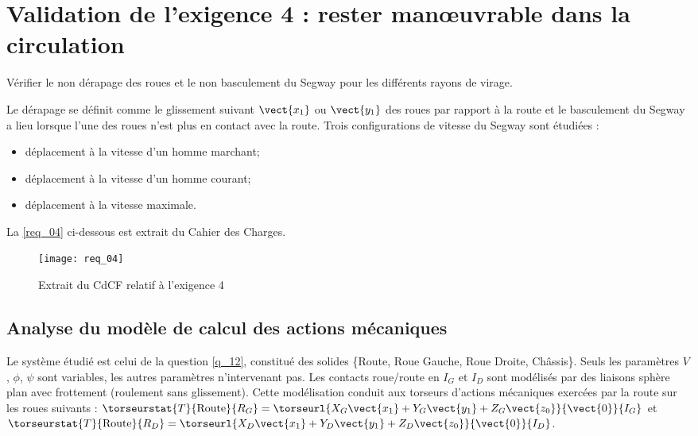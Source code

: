\section{Validation de l'exigence 4 : rester man\oe{}uvrable dans la circulation}
\begin{obj}
Vérifier le non dérapage des roues et le non basculement du Segway pour les différents rayons de virage.
\end{obj}
\ifprof
\else

Le dérapage se définit comme le glissement suivant $\vect{x_1}$ ou $\vect{y_1}$ des roues par rapport à la route et le basculement du Segway a lieu lorsque l’une des roues n’est plus en contact avec la route. Trois configurations de vitesse du Segway sont étudiées :
\begin{itemize}
\item déplacement à la vitesse d’un homme marchant;
\item déplacement à la vitesse d’un homme courant;
\item déplacement à la vitesse maximale.
\end{itemize}

La \autoref{req_04} ci-dessous est extrait du Cahier des Charges.


\begin{figure}[H]
\centering
\texttt{[image: req\_04]}
\caption{Extrait du CdCF relatif à l'exigence 4 \label{req_04} }%
\end{figure}

\fi

\subsection{Analyse du modèle de calcul des actions mécaniques \label{sec:A}}

\ifprof
\else

Le système étudié est celui de la question \ref{q_12}, constitué des solides \{Route, Roue Gauche, Roue Droite, Châssis\}. Seuls les paramètres $V$, $\phi$, $\psi$ sont variables, les autres paramètres n’intervenant pas. Les contacts roue/route en $I_G$ et $I_D$ sont modélisés par des liaisons sphère plan avec frottement (roulement sans glissement). Cette modélisation conduit aux torseurs d’actions mécaniques exercées par la route sur les roues suivants :
$\torseurstat{T}{\text{Route}}{R_{G}} = \torseurl{X_G\vect{x_1}+Y_G\vect{y_1}+Z_G\vect{z_0}}{\vect{0}}{I_G}$
  et  
$\torseurstat{T}{\text{Route}}{R_{D}} = \torseurl{X_D\vect{x_1}+Y_D\vect{y_1}+Z_D\vect{z_0}}{\vect{0}}{I_D}$.


